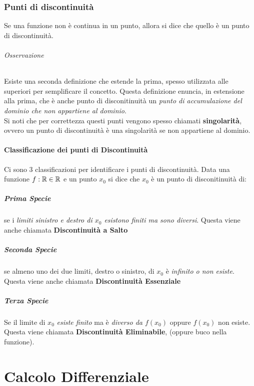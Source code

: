 \documentclass[12pt, a4paper, openany]{book}
\begin{document}
	\subsection*{Punti di discontinuità}
	Se una funzione non è continua in un punto, allora si dice che quello è un punto di discontinuità.


	\subparagraph*{Osservazione} Esiste una seconda definizione che estende la prima, spesso utilizzata alle superiori per semplificare il concetto.
	Questa definizione enuncia, in estensione alla prima, che è anche punto di disconitinuità un \emph{punto di accumulazione del dominio che non appartiene al dominio}.
	\\Si noti che per correttezza questi punti vengono spesso chiamati \textbf{singolarità}, ovvero un punto di discontinuità è una singolarità se non appartiene al dominio.
	\subsubsection*{Classificazione dei punti di Discontinuità}
	Ci sono 3 classificazioni per identificare i punti di discontinuità.
	Data una funzione $f:\mathbb{R} \in \mathbb{R}$ e un punto $x_0$ si dice che $x_0$ è un punto di disconitinuità di:
	\paragraph{Prima Specie} se i \emph{limiti sinistro e destro di $x_0$ esistono finiti ma sono diversi}.
	Questa viene anche chiamata \textbf{Discontinuità a Salto}
	\paragraph{Seconda Specie} se almeno uno dei due limiti, destro o sinistro, di $x_0$ è \emph{infinito o non esiste}.
	Questa viene anche chiamata \textbf{Discontinuità Essenziale}
	\paragraph{Terza Specie} Se il limite di $x_0$ \emph{esiste finito} ma è \emph{diverso da $f(x_0)$} oppure $f(x_0)$ non esiste.
	Questa viene chiamata \textbf{Discontinuità Eliminabile}, (oppure buco nella funzione).


	\chapter{Calcolo Differenziale}
\end{document}
